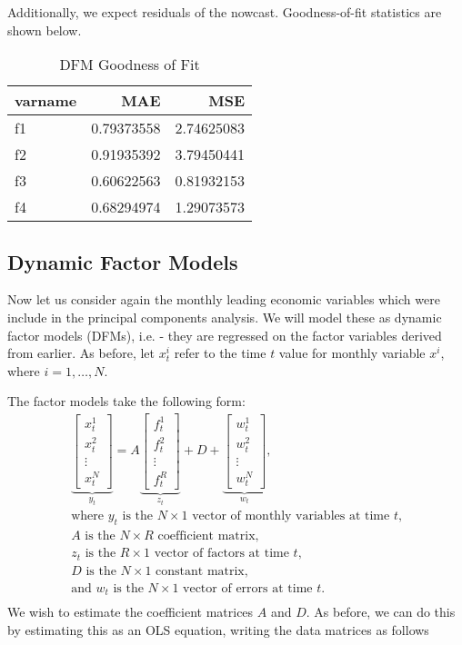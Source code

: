 \documentclass[11pt, letterpaper]{article}\usepackage[]{graphicx}\usepackage[]{color}
\begin{document}
Additionally, we expect residuals of the nowcast. Goodness-of-fit statistics are shown below.
\begin{table}[H]
\centering
\begingroup\footnotesize
\begin{tabular}{lrr}
  \hline
varname & MAE & MSE \\ 
  \hline
f1 & 0.79373558 & 2.74625083 \\ 
  f2 & 0.91935392 & 3.79450441 \\ 
  f3 & 0.60622563 & 0.81932153 \\ 
  f4 & 0.68294974 & 1.29073573 \\ 
   \hline
\end{tabular}
\endgroup
\caption{DFM Goodness of Fit} 
\end{table}




\subsection{Dynamic Factor Models}
Now let us consider again the monthly leading economic variables which were include in the principal components analysis. We will model these as dynamic factor models (DFMs), i.e. - they are regressed on the factor variables derived from earlier. As before, let $x^i_t$ refer to the time $t$ value for monthly variable $x^i$, where $i = 1, \dots, N$.

The factor models take the following form:
\begin{align*}
\underbrace{\begin{bmatrix}
	x^1_t\\
	x^2_t\\
	\vdots \\
	x^N_t
\end{bmatrix}}_{y_t}
=
A
\underbrace{\begin{bmatrix}
	f^1_{t}\\
	f^2_{t}\\
	\vdots \\
	f^R_{t}
\end{bmatrix}}_{z_t}
+
D 
+
\underbrace{\begin{bmatrix}
	w^1_t\\
	w^2_t\\
	\vdots\\
	w^N_t
\end{bmatrix}}_{w_t},\\
\text{where $y_t$ is the $N \times 1$ vector of monthly variables at time $t$,}\\
\text{$A$ is the $N \times R$ coefficient matrix,}\\
\text{$z_t$ is the $R \times 1$ vector of factors at time $t$,}\\
\text{$D$ is the $N \times 1$ constant matrix,}\\
\text{and $w_t$ is the $N \times 1$ vector of errors at time $t$.}\\
\end{align*}
We wish to estimate the coefficient matrices $A$ and $D$. As before, we can do this by estimating this as an OLS equation, writing the data matrices as follows
\end{document}
